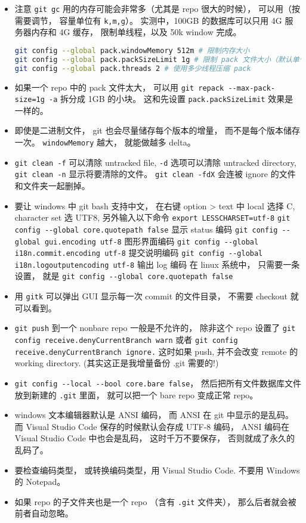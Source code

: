 \begin{itemize}
\item 注意 \verb|git gc| 用的内存可能会非常多（尤其是 repo 很大的时候）， 可以用（按需要调节， 容量单位有 \verb|k,m,g|）。 实测中，100GB 的数据库可以只用 4G 服务器内存和 4G 缓存， 限制单线程，以及 50k window 完成。
\begin{lstlisting}[language=bash]
git config --global pack.windowMemory 512m # 限制内存大小
git config --global pack.packSizeLimit 1g # 限制 pack 文件大小（默认单个文件）
git config --global pack.threads 2 # 使用多少线程压缩 pack
\end{lstlisting}
\item 如果一个 repo 中的 pack 文件太大， 可以用 \verb|git repack --max-pack-size=1g -a| 拆分成 1GB 的小块。 这和先设置 \verb|pack.packSizeLimit| 效果是一样的。
\item 即使是二进制文件， git 也会尽量储存每个版本的增量， 而不是每个版本储存一次。 \verb|windowMemory| 越大， 就能做越多 delta。
\item \verb|git clean -f| 可以清除 untracked file, \verb|-d| 选项可以清除 untracked directory,  \verb|git clean -n| 显示将要清除的文件。 \verb|git clean -fdX| 会连被 ignore 的文件和文件夹一起删掉。
\item 要让 windows 中 git bash 支持中文， 在右键 option > text 中 local 选择 C, character set 选 UTF8, 另外输入以下命令
\verb|export LESSCHARSET=utf-8|
\verb|git config --global core.quotepath false|     显示 status 编码
\verb|git config --global gui.encoding utf-8|    图形界面编码
\verb|git config --global i18n.commit.encoding utf-8|   提交说明编码
\verb|git config --global i18n.logoutputencoding utf-8| 输出 log 编码
在 linux 系统中， 只需要一条设置， 就是
\verb|git config --global core.quotepath false|
\item 用 \verb|gitk| 可以弹出 GUI 显示每一次 commit 的文件目录， 不需要 checkout 就可以看到。
\item \verb|git push| 到一个 nonbare repo 一般是不允许的， 除非这个 repo 设置了 \verb|git config receive.denyCurrentBranch warn| 或者 \verb|git config receive.denyCurrentBranch ignore.| 这时如果 push, 并不会改变 remote 的 working directory. (其实这正是我增量备份 .git 需要的!)
\item \verb|git config --local --bool core.bare false|， 然后把所有文件数据库文件放到新建的 \verb|.git| 里面， 就可以把一个 bare repo 变成正常 repo。
\item windows 文本编辑器默认是 ANSI 编码， 而 ANSI 在 git 中显示的是乱码。 而 Visual Studio Code 保存的时候默认会存成 UTF-8 编码， ANSI 编码在 Visual Studio Code 中也会是乱码， 这时千万不要保存， 否则就成了永久的乱码了。
\item 要检查编码类型， 或转换编码类型，用 Visual Studio Code.  不要用 Windows 的 Notepad。
\item 如果 repo 的子文件夹也是一个 repo （含有 \verb|.git| 文件夹）， 那么后者就会被前者自动忽略。
\end{itemize}

